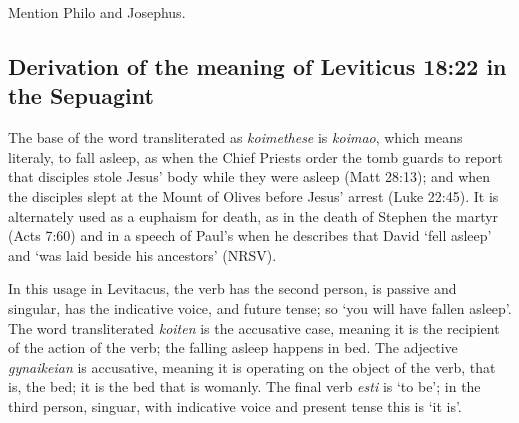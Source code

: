 \documentclass[10pt]{article}
\begin{document}
Mention Philo and Josephus. 

\appendix
\subsection{Derivation of the meaning of Leviticus 18:22 in the Sepuagint}\label{A}
The base of the word transliterated as \textit{koimethese} is \textit{koimao}, which means literaly, to fall asleep, as when the Chief Priests order the tomb guards to report that disciples stole Jesus' body while they were asleep (Matt 28:13); and when the disciples slept at the Mount of Olives before Jesus' arrest (Luke 22:45). It is alternately used as a euphaism for death, as in the death of Stephen the martyr (Acts 7:60) and in a speech of Paul's when he describes that David `fell asleep' and `was laid beside his ancestors' (NRSV).

In this usage in Levitacus, the verb has the second person, is passive and singular, has the indicative voice, and future tense; so `you will have fallen asleep'. The word transliterated \textit{koiten} is the accusative case, meaning it is the recipient of the action of the verb; the falling asleep happens in bed. The adjective \textit{gynaikeian} is accusative, meaning it is operating on the object of the verb, that is, the bed; it is the bed that is womanly. The final verb \textit{esti} is `to be'; in the third person, singuar, with indicative voice and present tense this is `it is'.
\end{document}
